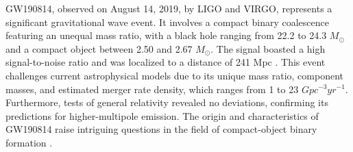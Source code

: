 GW190814, observed on August 14, 2019, \citep{abbott2020gw190814} by LIGO and VIRGO, represents a significant gravitational wave event. It involves a compact binary coalescence featuring an unequal mass ratio, with a black hole ranging from 22.2 to 24.3 $M_\odot$ and a compact object between 2.50 and 2.67 $M_\odot$. The signal boasted a high signal-to-noise ratio and was localized to a distance of 241 Mpc \citep{abbott2020gw190814}\citep{staff2020mysteryobject}\citep{staff2020gw190814}. This event challenges current astrophysical models due to its unique mass ratio, component masses, and estimated merger rate density, which ranges from 1 to 23 $Gpc^{-3} yr^{-1}$. Furthermore, tests of general relativity revealed no deviations, confirming its predictions for higher-multipole emission. The origin and characteristics of GW190814 raise intriguing questions in the field of compact-object binary formation \cite{abbott2020gw190814}\citep{staff2020mysteryobject}\citep{staff2020gw190814}.

